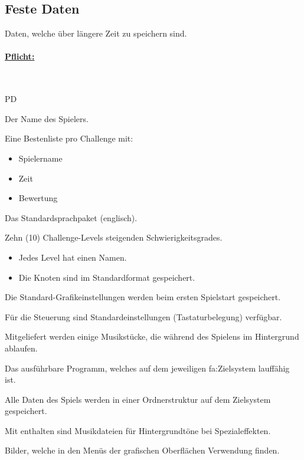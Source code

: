 %
%


\subsection{Feste Daten}
\label{PD:persDat}

Daten, welche über längere Zeit zu speichern sind.\\


%
%
\paragraph*{\underline{Pflicht:}}~\\


\begin{ids}{\gls{PD}}

	\id[ 10] Der Name des Spielers.
	
	\id[ 20] Eine Bestenliste pro Challenge mit:
	
		\begin{itemize}
		
			\item Spielername
			\item Zeit
			\item Bewertung
			
		\end{itemize}
	
	\id[ 30] Das Standardsprachpaket (englisch).
	
	\id[ 40] Zehn (10) Challenge-Levels steigenden Schwierigkeitsgrades.
	
	\begin{itemize}
	
		\item Jedes Level hat einen Namen.
		\item Die Knoten sind im Standardformat gespeichert.
		
	\end{itemize}
	
	\id[ 50] Die Standard-Grafikeinstellungen werden beim ersten Spielstart gespeichert.
	
	\id[ 60] Für die Steuerung sind Standardeinstellungen (Tastaturbelegung) verfügbar.
	
	\id[ 70] Mitgeliefert werden einige Musikstücke, die während des Spielens im Hintergrund ablaufen.
	
	\id[ 80] Das ausführbare Programm, welches auf dem jeweiligen \gls{fa:Zielsystem} lauffähig ist.
	
	\id[ 90] Alle Daten des Spiels werden in einer Ordnerstruktur auf dem Zielsystem gespeichert.
	
	\id[100] Mit enthalten sind Musikdateien für Hintergrundtöne bei Spezialeffekten.
	
	\id[110] Bilder, welche in den Menüs der grafischen Oberflächen Verwendung finden.
	
\end{ids}


